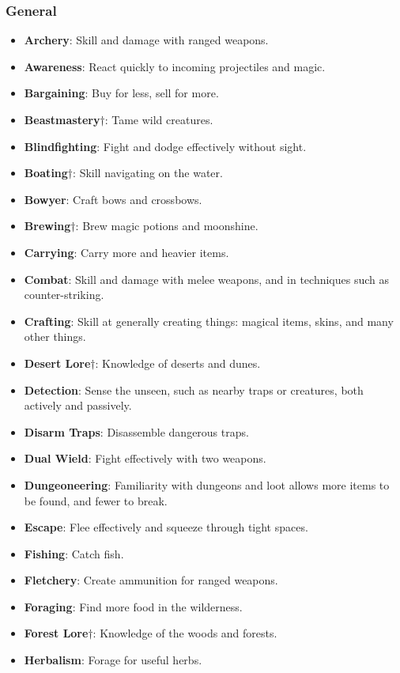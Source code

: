 \subsubsection{General}
\begin{itemize}
\item {\bf Archery}: Skill and damage with ranged weapons.
\item {\bf Awareness}: React quickly to incoming projectiles and magic.
\item {\bf Bargaining}: Buy for less, sell for more.
\item {\bf Beastmastery}$\dagger$: Tame wild creatures.
\item {\bf Blindfighting}: Fight and dodge effectively without sight. 
\item {\bf Boating}$\dagger$: Skill navigating on the water.
\item {\bf Bowyer}: Craft bows and crossbows.
\item {\bf Brewing}$\dagger$: Brew magic potions and moonshine. 
\item {\bf Carrying}: Carry more and heavier items.
\item {\bf Combat}: Skill and damage with melee weapons, and in techniques such as counter-striking.
\item {\bf Crafting}: Skill at generally creating things: magical items, skins, and many other things.
\item {\bf Desert Lore}$\dagger$: Knowledge of deserts and dunes. 
\item {\bf Detection}: Sense the unseen, such as nearby traps or creatures, both actively and passively.
\item {\bf Disarm Traps}: Disassemble dangerous traps. 
\item {\bf Dual Wield}: Fight effectively with two weapons. 
\item {\bf Dungeoneering}: Familiarity with dungeons and loot allows more items to be found, and fewer to break.
\item {\bf Escape}: Flee effectively and squeeze through tight spaces.
\item {\bf Fishing}: Catch fish.
\item {\bf Fletchery}: Create ammunition for ranged weapons.
\item {\bf Foraging}: Find more food in the wilderness.
\item {\bf Forest Lore}$\dagger$: Knowledge of the woods and forests. 
\item {\bf Herbalism}: Forage for useful herbs. 

\end{itemize}
